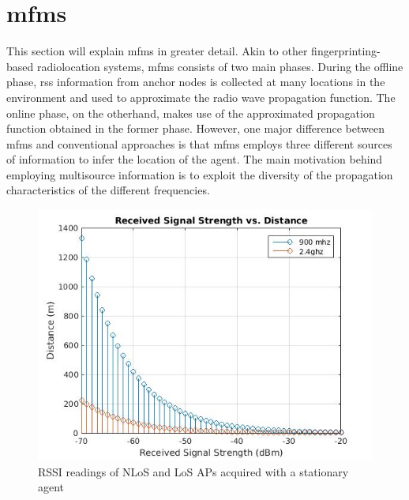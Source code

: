 \section{\gls{mfms}}
\label{sec:mfms}
    This section will explain \gls{mfms} in greater detail.
    Akin to other fingerprinting-based radiolocation systems, \gls{mfms} consists of two main phases.
    During the offline phase, \gls{rss} information from anchor nodes is collected at many locations in the environment and used to approximate the radio wave propagation function.
    The online phase, on the otherhand, makes use of the approximated propagation function obtained in the former phase.
    However, one major difference between \gls{mfms} and conventional approaches is that \gls{mfms} employs three different sources of information to infer the location of the agent.
    The main motivation behind employing multisource information is to exploit the diversity of the propagation characteristics of the different frequencies.

    \begin{figure}[thpb]
       \centering
       \includegraphics[width=\linewidth]{figures/rss-vs-distance.jpg}
       \caption{\label{fig:log-distance}RSSI readings of NLoS and LoS APs acquired with a stationary agent}
    \end{figure}

